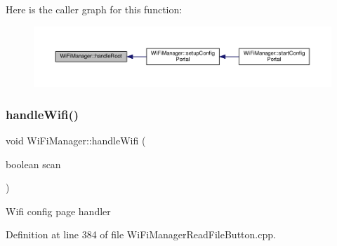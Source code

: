 Here is the caller graph for this function\+:\nopagebreak
\begin{figure}[H]
\begin{center}
\leavevmode
\includegraphics[width=350pt]{d4/dc8/class_wi_fi_manager_a47e4c7df7478f690c53ff9f5125c9760_icgraph}
\end{center}
\end{figure}
\mbox{\label{class_wi_fi_manager_a57a9048175c1918340ab9d0a2c53601f}} 
\subsubsection{\texorpdfstring{handle\+Wifi()}{handleWifi()}}
{\footnotesize\ttfamily void Wi\+Fi\+Manager\+::handle\+Wifi (\begin{DoxyParamCaption}\item[{boolean}]{scan }\end{DoxyParamCaption})\hspace{0.3cm}{\ttfamily [private]}}

Wifi config page handler 

Definition at line 384 of file Wi\+Fi\+Manager\+Read\+File\+Button.\+cpp.



